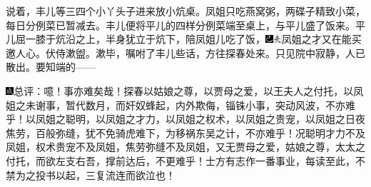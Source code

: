 说着，丰儿等三四个小丫头子进来放小炕桌。凤姐只吃燕窝粥，两碟子精致小菜，每日分例菜已暂减去。丰儿便将平儿的四样分例菜端至桌上，与平儿盛了饭来。平儿屈一膝于炕沿之上，半身犹立于炕下，陪凤姐儿吃了饭，{\includegraphics[width=3mm]{../Images/00003}\includegraphics[width=3mm]{../Images/00012}\footnotesize \kaishu 凤姐之才又在能买邀人心。}伏侍漱盥。漱毕，嘱咐了丰儿些话，方往探春处来。只见院中寂静，人已散出。要知端的------

{\includegraphics[width=3mm]{../Images/00005}总评：噫！事亦难矣哉！探春以姑娘之尊，以贾母之爱，以王夫人之付托，以凤姐之未谢事，暂代数月，而奸奴蜂起，内外欺侮，锱铢小事，突动风波，不亦难乎！以凤姐之聪明，以凤姐之才力，以凤姐之权术，以凤姐之贵宠，以凤姐之日夜焦劳，百般弥缝，犹不免骑虎难下，为移祸东吴之计，不亦难乎！况聪明才力不及凤姐，权术贵宠不及凤姐，焦劳弥缝不及凤姐，又无贾母之爱，姑娘之尊，太太之付托，而欲左支右吾，撑前达后，不更难乎！士方有志作一番事业，每读至此，不禁为之投书以起，三复流连而欲泣也！}

